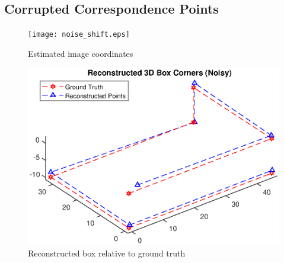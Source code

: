 \documentclass[12pt]{article}
\begin{document}
\subsection{Corrupted Correspondence Points}

	\begin{figure}[h]
	\centering %
	\captionsetup{justification=centering}
	\begin{minipage}{0.5\textwidth}
		\centering
		\texttt{[image: noise\_shift.eps]}
		\caption{Estimated image coordinates} \label{noiseshift}
	\end{minipage}\hfill
	\begin{minipage}{0.5\textwidth}
		\centering %
		\includegraphics[width=1\textwidth]{noise_shift_recon.eps}
		\caption{Reconstructed box relative to ground truth} \label{noiserecon}
	\end{minipage}
\end{figure}
\end{document}
